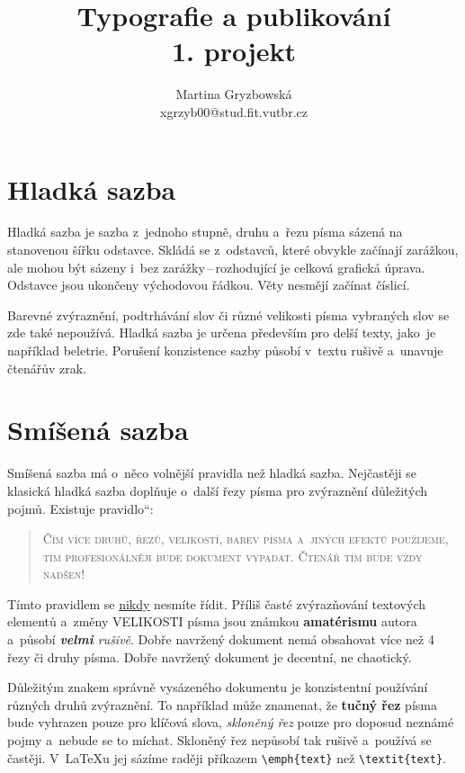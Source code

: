 \documentclass[a4paper,11pt,twocolumn]{article}
\title{Typografie a publikování	\\
1. projekt\\}
\author{Martina Gryzbowská \\
xgrzyb00@stud.fit.vutbr.cz}
\date{}
\newcommand{\myuv}[1]{\quotedblbase #1\textquotedblleft}
\begin{document}
	\maketitle
	\section{Hladká sazba}
	Hladká sazba je sazba z~jednoho stupně, druhu a~řezu písma sázená na stanovenou šířku odstavce. Skládá se z~odstavců, které obvykle začínají zarážkou, ale mo\-hou být sázeny i~bez zarážky\,--\,rozhodující je celková grafická úprava. Odstavce jsou ukončeny východovou řádkou. Věty nesmějí začínat číslicí.
	
	Barevné zvýraznění, podtrhávání slov či různé velikosti písma vybraných slov se zde také nepoužívá. Hladká sazba je určena především pro delší texty, jako~je například beletrie. Porušení konzistence sazby pů\-so\-bí v~textu rušivě a~unavuje čtenářův zrak.
	
	\section{Smíšená sazba}
Smíšená sazba má o~něco volnější pravidla než hladká sazba. Nejčastěji se klasická hladká sazba doplňuje o~další řezy písma pro zvýraznění důležitých pojmů. Existuje \myuv{pravidlo}:

\begin{quotation}
	\scshape{Čím více druhů, řezů, velikostí, barev písma a~jiných efektů po\-u\-ži\-je\-me, tím profesionálněji bude do\-ku\-ment vypadat. Čtenář tím bude vždy nadšen!}
\end{quotation}	

Tímto pravidlem se \underline{nikdy} nesmíte řídit. Příliš časté zvýrazňování textových elementů a~změny {\huge V}{\LARGE E}{\Large L}{\large I}{\normalsize K}{\small O}{\footnotesize S}{\scriptsize T}{\tiny I} písma {\Large jsou} {\LARGE známkou} {\huge \bfseries a\-ma\-tér\-is\-mu} autora a~působí \emph{\textbf{velmi}  rušivě}. Dobře navržený dokument nemá obsahovat více než 4 řezy či druhy písma. {\ttfamily Dobře navržený dokument je decentní, ne chaotický}.

Důležitým znakem správně vysázeného dokumentu je konzistentní používání různých druhů zvýraznění. To například může znamenat, že {\bfseries tučný řez} písma bude vyhrazen pouze pro klíčová slova, \emph{skloněný řez} pouze pro doposud neznámé pojmy a~nebude se to míchat. Skloněný řez nepůsobí tak rušivě a~používá se častěji. V~\LaTeX u jej sázíme raději příkazem \verb|\emph{text}| než \verb|\textit{text}|.
\end{document}
